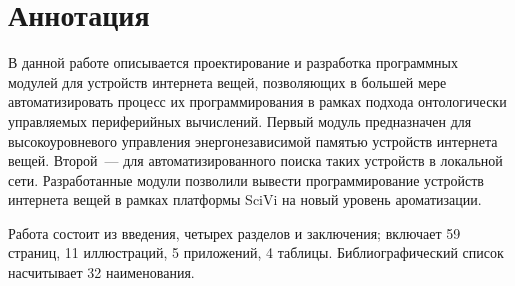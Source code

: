 \hidefromtoc
\chapter*{Аннотация}
\unhidefromtoc

В данной работе описывается проектирование и разработка программных модулей для устройств интернета вещей, позволяющих в большей мере автоматизировать процесс их программирования в рамках подхода онтологически управляемых периферийных вычислений.
Первый модуль предназначен для высокоуровневого управления энергонезависимой памятью устройств интернета вещей.
Второй~--- для автоматизированного поиска таких устройств в локальной сети.
Разработанные модули позволили вывести программирование устройств интернета вещей в рамках платформы SciVi на новый уровень ароматизации.

Работа состоит из введения, четырех разделов и заключения; включает 59 страниц, 11 иллюстраций, 5 приложений, 4 таблицы. Библиографический список насчитывает 32 наименования.